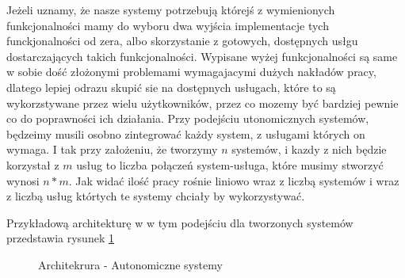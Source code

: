 Jeżeli uznamy, że nasze systemy potrzebują którejś z wymienionych funkcjonalności mamy do wyboru dwa wyjścia implementacje tych funckjonalności od zera, albo skorzystanie z gotowych, dostępnych usłgu dostarczających takich funkcjonalności. Wypisane wyżej funkcjonalności są same w sobie dość złożonymi problemami wymagajacymi dużych nakładów pracy, dlatego lepiej odrazu skupić sie na dostępnych usługach, które to są wykorzstywane przez wielu użytkowników, przez co mozemy być bardziej pewnie co do poprawności ich działania. Przy podejściu utonomicznych systemów, będzeimy musili osobno zintegrować każdy system, z usługami których on wymaga. I tak przy założeniu, że tworzymy \begin{math}n\end{math} systemów, i kazdy z nich będzie korzystał z \begin{math}m\end{math} usług to liczba połączeń system-usługa, które musimy stworzyć wynosi \begin{math}n*m\end{math}. Jak widać ilość pracy rośnie liniowo wraz z liczbą systemów i wraz z liczbą usług którtych te systemy chciały by wykorzystywać.

 Przykładową architekturę w w tym podejściu dla tworzonych systemów przedstawia rysunek \ref{fig:autonomiczne_systemy}

\setlength\fboxsep{20pt}
\setlength\fboxrule{1pt}
\begin{figure}[!h]
	\centering
	\caption{Architekrura - Autonomiczne systemy}\label{fig:autonomiczne_systemy}
\end{figure}

